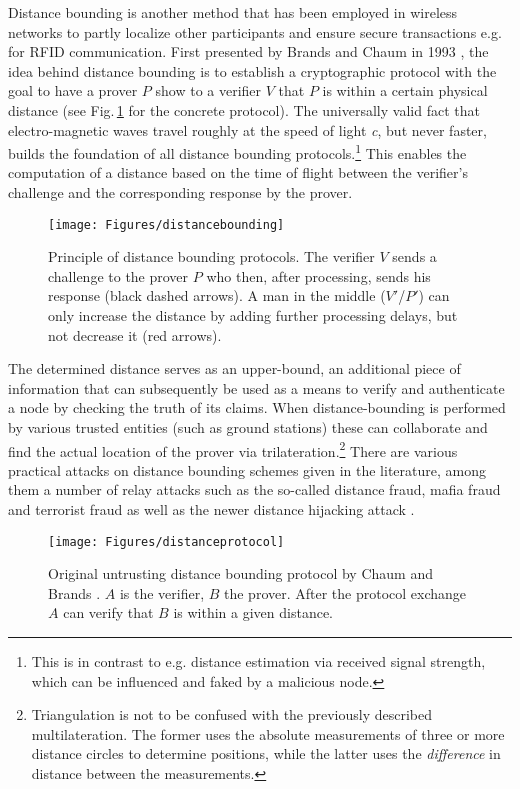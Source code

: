 \documentclass[english]{IEEEtran}
\begin{document}
Distance bounding is another method that has been employed in wireless
networks to partly localize other participants and ensure secure transactions
e.g. for RFID communication. First presented by Brands and Chaum in
1993 \cite{Brands1994}, the idea behind distance bounding is to establish
a\emph{ }cryptographic protocol with the goal to have a prover $P$
show to a verifier $V$ that $P$ is within a certain physical distance
(see Fig.\,\ref{fig:Original-untrusting-distanec} for the concrete
protocol).\emph{ }The universally valid fact that electro-magnetic
waves travel roughly at the speed of light \emph{c}, but never faster,
builds the foundation of all distance bounding protocols.\footnote{This is in contrast to e.g. distance estimation via received signal
strength, which can be influenced and faked by a malicious node.} This enables the computation of a distance based on the time of flight
between the verifier's challenge and the corresponding response by
the prover. 
\begin{figure}
\texttt{[image: Figures/distancebounding]}

\caption{Principle of distance bounding protocols. The verifier $V$ sends
a challenge to the prover $P$ who then, after processing, sends his
response (black dashed arrows). A man in the middle ($V'$/$P'$)
can only increase the distance by adding further processing delays,
but not decrease it (red arrows).}


\end{figure}
The determined distance serves as an upper-bound, an additional piece
of information that can subsequently be used as a means to verify
and authenticate a node by checking the truth of its claims. When
distance-bounding is performed by various trusted entities (such as
ground stations) these can collaborate and find the actual location
of the prover via trilateration.\footnote{Triangulation is not to be confused with the previously described
multilateration. The former uses the absolute measurements of three
or more distance circles to determine positions, while the latter
uses the \emph{difference} in distance between the measurements.} There are various practical attacks on distance bounding schemes
given in the literature, among them a number of relay attacks such
as the so-called distance fraud, mafia fraud and terrorist fraud \cite{Clulow2006}
as well as the newer distance hijacking attack \cite{Cremers2012}.
\begin{figure}
\begin{centering}
\texttt{[image: Figures/distanceprotocol]}
\par\end{centering}

\caption{Original untrusting distance bounding protocol by Chaum and Brands
\label{fig:Original-untrusting-distanec} \cite{Brands1994}. $A$
is the verifier, $B$ the prover. After the protocol exchange $A$
can verify that $B$ is within a given distance.}


\end{figure}
\end{document}
